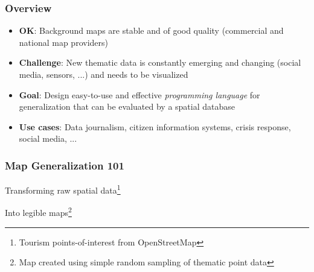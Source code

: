 \documentclass{beamer}
\begin{document}

\frame
{
  \frametitle{Overview}
  \begin{center}
  \end{center}
  
  \begin{itemize}
  \item \textbf{OK}: Background maps are stable and of good quality (commercial and national map providers)
  \item \textbf{Challenge}: New thematic data is constantly emerging and changing (social media, sensors, ...) and needs to be visualized
  \item \textbf{Goal}: Design easy-to-use and effective \emph{programming language} for generalization that can be evaluated by a spatial database  \item \textbf{Use cases}: Data journalism, citizen information systems, crisis response, social media, ...
  \end{itemize}
}

\frame
{
  \frametitle{Map Generalization 101}
  Transforming raw spatial data\footnote{Tourism points-of-interest from OpenStreetMap}
  \begin{center}
  \end{center}
  Into legible maps\footnote{Map created using simple random sampling of thematic point data}
  \begin{center}
  \end{center}
}
\end{document}
